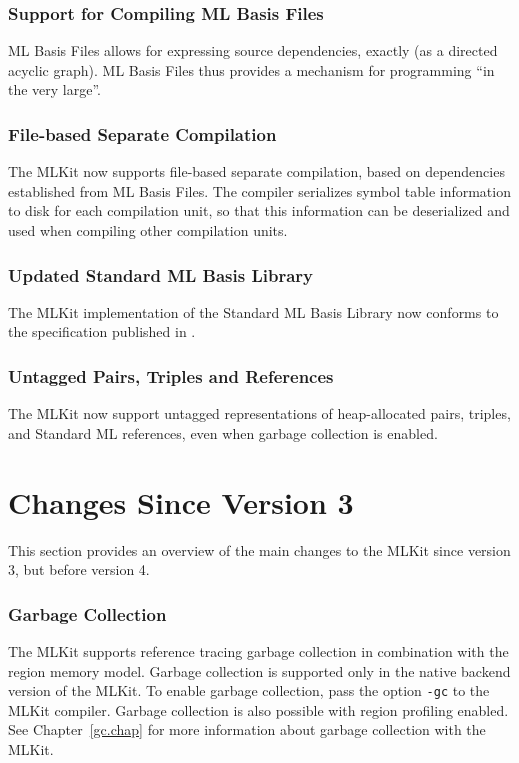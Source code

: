 \documentclass[12pt]{book}
\begin{document}
\subsubsection*{Support for Compiling ML Basis Files}
%
ML Basis Files allows for expressing source dependencies, exactly (as
a directed acyclic graph). ML Basis Files thus provides a mechanism
for programming ``in the very large''.

\subsubsection*{File-based Separate Compilation}
%
The MLKit now supports file-based separate compilation, based on
dependencies established from ML Basis Files. The compiler serializes
symbol table information to disk for each compilation unit, so that
this information can be deserialized and used when compiling other
compilation units.

\subsubsection*{Updated Standard ML Basis Library}
%
%
The MLKit implementation of the Standard ML Basis Library now conforms to the
  specification published in \cite{basislib2004}.

\subsubsection*{Untagged Pairs, Triples and References}
%
%
%
%
The MLKit now support untagged representations of heap-allocated
pairs, triples, and Standard ML references, even when garbage
collection is enabled.

\section{Changes Since Version 3}
%
This section provides an overview of the main changes to the MLKit
since version 3, but before version 4.

\subsubsection*{Garbage Collection}
%
The MLKit supports reference tracing garbage collection in
combination with the region memory model. Garbage collection is
supported only in the native backend version of the MLKit. To enable
garbage collection, pass the option \texttt{-gc} to the MLKit compiler. Garbage
collection is also possible with region profiling enabled. See
Chapter~\ref{gc.chap} for more information about garbage collection
with the MLKit.
\end{document}
